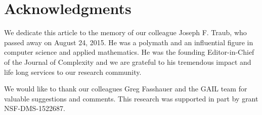 \documentclass[review]{elsarticle}
\theoremstyle{definition}
\begin{document}
\section*{Acknowledgments}

We dedicate this article to the memory of our colleague Joseph F. Traub, who
passed away on August 24, 2015. He was a polymath and an influential figure in
computer science and applied mathematics. He was the founding Editor-in-Chief of
the Journal of Complexity and we are grateful to his tremendous impact and life
long services to our research community.

We would like to thank our colleagues Greg Fasshauer and the GAIL team for
valuable suggestions and comments. This research was supported in part by grant
NSF-DMS-1522687.





\end{document}
